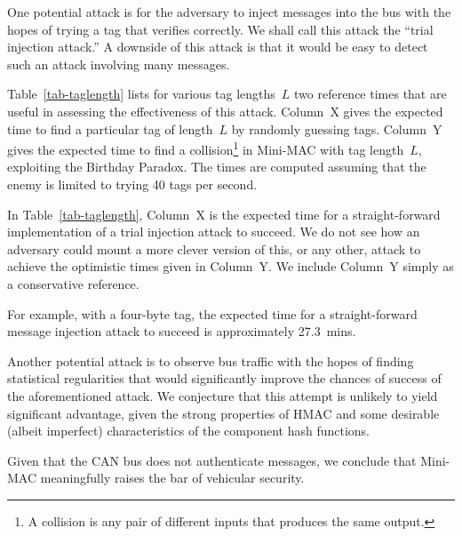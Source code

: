One potential attack is for the adversary to inject messages into the bus with the hopes
of trying a tag that verifies correctly.  We shall call this attack the ``trial injection attack.''
A downside of this attack is that it would be easy to detect such an attack involving
many messages.

Table~\ref{tab-taglength} lists for various tag lengths~$L$
two reference times that are useful in assessing the effectiveness of this attack.
Column~X gives the expected time to find a particular tag of length~$L$ by
randomly guessing tags.
Column~Y gives the expected time to find a collision\footnote{A collision is any pair of 
different inputs that produces the same output.}
in Mini-MAC with tag length~$L$,
exploiting the Birthday Paradox.  
The times are computed assuming that the enemy is limited to trying 40 tags per second.

In Table~\ref{tab-taglength}, Column~X is the expected time for a straight-forward 
implementation of a trial injection attack to succeed.  We do not see how an adversary
could mount a more clever version of this, or any other, attack to achieve
the optimistic times given in Column~Y.  We include Column~Y simply as a
conservative reference.

For example, with a four-byte tag, the expected time for a straight-forward 
message injection attack to succeed is approximately 27.3~mins.  

Another potential attack is to observe bus traffic with the hopes of finding statistical
regularities that would significantly improve the chances of success of the aforementioned attack.
We conjecture that this attempt is unlikely to yield significant advantage, given the
strong properties of HMAC and some
desirable (albeit imperfect) characteristics of the component hash functions.

Given that the CAN bus does not authenticate messages, we conclude that Mini-MAC
meaningfully raises the bar of vehicular security.

